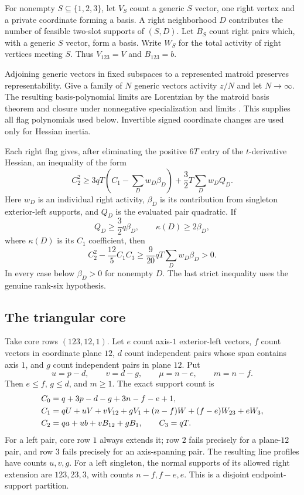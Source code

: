 \documentclass[11pt,a4paper]{article}
\theoremstyle{remark}\newtheorem{remark}[theorem]{Remark}
\begin{document}
For nonempty $S\subseteq\{1,2,3\}$, let $V_S$ count a generic $S$ vector, one right vertex and a private coordinate forming a basis. A right neighborhood $D$ contributes the number of feasible two-slot supports of $(S,D)$. Let $B_S$ count right pairs which, with a generic $S$ vector, form a basis. Write $W_S$ for the total activity of right vertices meeting $S$. Thus $V_{123}=V$ and $B_{123}=b$.

Adjoining generic vectors in fixed subspaces to a represented matroid preserves representability. Give a family of $N$ generic vectors activity $z/N$ and let $N\to\infty$. The resulting basis-polynomial limits are Lorentzian by the matroid basis theorem and closure under nonnegative specialization and limits \cite{b:BH}. This supplies all flag polynomials used below. Invertible signed coordinate changes are used only for Hessian inertia.

Each right flag gives, after eliminating the positive $6T$ entry of the $t$-derivative Hessian, an inequality of the form
\begin{equation}\label{mrn:e:se:eq:schur}
 C_2^2\ge3qT\left(C_1-\sum_D w_D\beta_D\right)
             +\frac32T\sum_Dw_D Q_D.
\end{equation}
Here $w_D$ is an individual right activity, $\beta_D$ is its contribution from singleton exterior-left supports, and $Q_D$ is the evaluated pair quadratic. If
\begin{equation}\label{mrn:e:se:eq:criterion}
 Q_D\ge\frac32q\beta_D,\qquad
 \kappa(D)\ge2\beta_D,
\end{equation}
where $\kappa(D)$ is its $C_1$ coefficient, then
\begin{equation}\label{mrn:e:se:eq:margin}
 C_2^2-\frac{12}{5}C_1C_3
 \ge\frac9{20}qT\sum_Dw_D\beta_D>0.
\end{equation}
In every case below $\beta_D>0$ for nonempty $D$. The last strict inequality uses the genuine rank-six hypothesis.

\subsection{The triangular core}
Take core rows $(123,12,1)$. Let $e$ count axis-$1$ exterior-left vectors, $f$ count vectors in coordinate plane $12$, $d$ count independent pairs whose span contains axis $1$, and $g$ count independent pairs in plane $12$. Put
\[
 u=p-d,\qquad v=d-g,\qquad \mu=n-e,\qquad m=n-f.
\]
Then $e\le f$, $g\le d$, and $m\ge1$. The exact support count is
\begin{align}
 C_0&=q+3p-d-g+3n-f-e+1,\label{mrn:e:se:eq:tri}\\
 C_1&=qU+uV+vV_{12}+gV_1
       +(n-f)W+(f-e)W_{23}+eW_3,\notag\\
 C_2&=qa+ub+vB_{12}+gB_1,\qquad C_3=qT.\notag
\end{align}
For a left pair, core row $1$ always extends it; row $2$ fails precisely for a plane-$12$ pair, and row $3$ fails precisely for an axis-spanning pair. The resulting line profiles have counts $u,v,g$. For a left singleton, the normal supports of its allowed right extension are $123,23,3$, with counts $n-f,f-e,e$. This is a disjoint endpoint-support partition.
\end{document}
